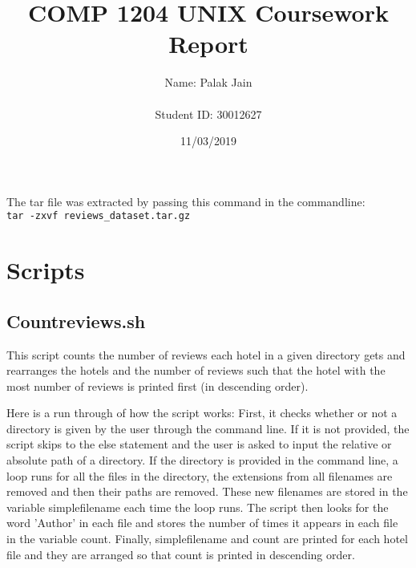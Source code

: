 \documentclass{article}
\title{COMP 1204 UNIX Coursework Report}
\author{Name: Palak Jain \\ \\Student ID: 30012627}
\date{11/03/2019}
\begin{document}
\maketitle
\newpage

\noindent The tar file was extracted by passing this command in the commandline:
\\
\texttt{tar -zxvf reviews\_dataset.tar.gz }

\section{Scripts}


\subsection{Countreviews.sh}
This script counts the number of reviews each hotel in a given directory gets and rearranges the hotels and the number of reviews such that the hotel with the most number of reviews is printed first (in descending order).

Here is a run through of how the script works:
First, it checks whether or not a directory is given by the user through the command line. If it is not provided, the script skips to the else statement and the user is asked to input the relative or absolute path of a directory. If the directory is provided in the command line, a loop runs for all the files in the directory, the extensions from all filenames are removed and then their paths are removed. These new filenames are stored in the variable simplefilename each time the loop runs. The script then looks for the word 'Author' in each file and stores the number of times it appears in each file in the variable count. Finally, simplefilename and count are printed for each hotel file and they are arranged so that count is printed in descending order.




\end{document}
